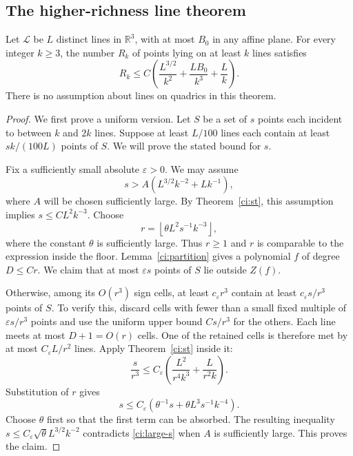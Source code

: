 \subsection{The higher-richness line theorem}

\begin{theorem}\label{ci:rich-lines}
Let $\mathcal L$ be $L$ distinct lines in $\mathbb R^3$, with at most
$B_0$ in any affine plane.  For every integer $k\ge3$, the number
$R_k$ of points lying on at least $k$ lines satisfies
\[
 R_k\le C\left(\frac{L^{3/2}}{k^2}
             +\frac{LB_0}{k^3}+\frac Lk\right).
\]
There is no assumption about lines on quadrics in this theorem.
\end{theorem}

\begin{proof}
We first prove a uniform version.  Let $S$ be a set of $s$ points each
incident to between $k$ and $2k$ lines.  Suppose at least $L/100$ lines
each contain at least $sk/(100L)$ points of $S$.  We will prove the
stated bound for $s$.

Fix a sufficiently small absolute $\varepsilon>0$.  We may assume
\begin{equation}\label{ci:large-s}
 s>A\left(L^{3/2}k^{-2}+Lk^{-1}\right),
\end{equation}
where $A$ will be chosen sufficiently large.  By
Theorem~\ref{ci:st}, this assumption implies $s\le C L^2k^{-3}$.
Choose
\[
 r=\left\lfloor\theta L^2s^{-1}k^{-3}\right\rfloor,
\]
where the constant $\theta$ is sufficiently large.  Thus $r\ge1$
and $r$ is comparable to the expression inside the floor.
Lemma~\ref{ci:partition} gives a polynomial $f$ of degree
$D\le Cr$.  We claim that at most $\varepsilon s$ points of $S$ lie
outside $Z(f)$.

Otherwise, among its $O(r^3)$ sign cells, at least $c_\varepsilon r^3$
contain at least $c_\varepsilon s/r^3$ points of $S$.  To verify this,
discard cells with fewer than a small fixed multiple of
$\varepsilon s/r^3$ points and use the uniform upper bound
$Cs/r^3$ for the others.  Each line meets at most $D+1=O(r)$ cells.
One of the retained cells is therefore met by at most
$C_\varepsilon L/r^2$ lines.  Apply Theorem~\ref{ci:st} inside it:
\[
 \frac{s}{r^3}
 \le C_\varepsilon\left(\frac{L^2}{r^4k^3}
                         +\frac L{r^2k}\right).
\]
Substitution of $r$ gives
\[
 s\le C_\varepsilon\left(\theta^{-1}s
                   +\theta L^3s^{-1}k^{-4}\right).
\]
Choose $\theta$ first so that the first term can be absorbed.  The
resulting inequality $s\le C_\varepsilon\sqrt\theta L^{3/2}k^{-2}$
contradicts \eqref{ci:large-s} when $A$ is sufficiently large.  This
proves the claim.


\end{proof}
